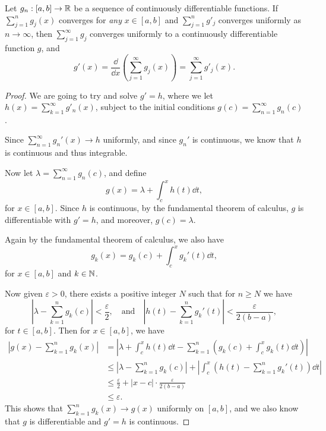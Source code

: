 \documentclass[a4paper]{scrartcl}
\begin{document}
\begin{theorem}
    Let $g_n: [a, b] \rightarrow \mathbb{R}$ be a sequence of continuously differentiable functions. If $\sum_{j = 1}^n g_j(x)$ converges for \emph{any} $x \in [a, b]$ and $\sum_{j = 1}^n g'_j$ converges uniformly as $n \rightarrow \infty$, then $\sum_{j = 1}^{\infty} g_j$ converges uniformly to a continuously differentiable function $g$, and
    $$
   g'(x) = \frac{\dd}{\dd x} \left(\sum_{j = 1}^{\infty} g_j(x)\right) = \sum_{j = 1}^{\infty} g'_j(x).
    $$
\end{theorem}
\begin{proof}
    We are going to try and solve $g' = h$, where we let $h(x) = \sum_{k = 1}^{\infty} g'_n(x)$, subject to the initial conditions $g(c) = \sum_{n = 1}^{\infty} g_n(c)$.

    Since $\sum_{n = 1}^{\infty} g_n'(x)\rightarrow h$ uniformly, and since $g_n'$ is continuous, we know that $h$ is continuous and thus integrable. 

    Now let $\lambda = \sum_{n = 1}^{\infty} g_n(c)$, and define
    $$
    g(x) = \lambda + \int_c^x h(t) \dd t,
    $$
    for $x \in [a, b]$. Since $h$ is continuous, by the fundamental theorem of calculus, $g$ is differentiable with $g' = h$, and moreover, $g(c) = \lambda$.

    Again by the fundamental theorem of calculus, we also have
    $$
    g_k(x) = g_k(c) + \int_c^x g_k'(t) \dd t,
    $$
    for $x \in [a, b]$ and $k \in \mathbb{N}$. 

    Now given $\varepsilon > 0$, there exists a positive integer $N$ such that for $n \geq N$ we have
    $$
    \left|\lambda - \sum_{k = 1}^n g_k(c)\right| < \frac{\varepsilon}{2}, \quad \text{and} \quad \left|h(t) - \sum_{k = 1}^n g_k'(t)\right| < \frac{\varepsilon}{2(b - a)},
    $$
    for $t \in [a, b]$. Then for $x \in [a, b]$, we have
    \begin{align*}
        \left|g(x) - \sum_{k = 1}^n g_k(x)\right| &= 
        \left|\lambda + \int_c^x h(t)\dd t - \sum_{k = 1}^n \left(g_k(c) + \int_c^x g_k(t) \dd t \right)\right|
        \\
        & \leq \left|\lambda - \sum_{k = 1}^n g_k(c)\right| + \left|\int_c^x \left(h(t) - \sum_{k = 1}^n g_k'(t) \right) \dd t\right| \\
        &\leq \frac{\varepsilon}{2} + |x - c| \cdot \frac{\varepsilon}{2(b - a)} \\&\leq \varepsilon.
    \end{align*}
    This shows that $\sum_{k = 1}^n g_k(x) \rightarrow g(x)$ uniformly on $[a, b]$, and we also know that $g$ is differentiable and $g' = h$ is continuous.
\end{proof}
\end{document}
